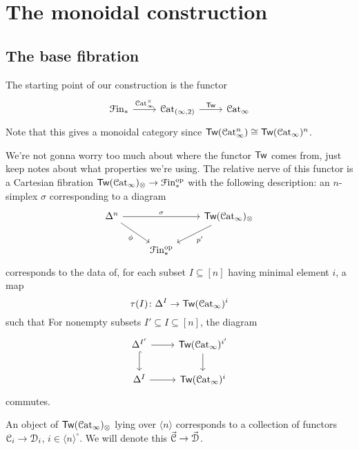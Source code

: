 \documentclass[main.tex]{subfiles}
\begin{document}
\section{The monoidal construction}
\label{sec:the_monoidal_construction}

\subsection{The base fibration}
\label{ssc:base_fibrations}

The starting point of our construction is the functor
\begin{equation*}
  \begin{tikzcd}
    \Finp
    \arrow[r, "\ICat^{\times}"]
    & \Cat_{(\infty, 2)}
    \arrow[r, "\Tw"]
    & \ICat
  \end{tikzcd}
\end{equation*}
Note that this gives a monoidal category since $\mathsf{Tw}(\mathcal{C}\mathrm{at}_{\infty}^{n})\cong \mathsf{Tw}(\mathcal{C}\mathrm{at}_{\infty})^{n}$.

We're not gonna worry too much about where the functor $\mathsf{Tw}$ comes from, just keep notes about what properties we're using. The relative nerve of this functor is a Cartesian fibration $\mathsf{Tw}(\mathcal{C}\mathrm{at}_{\infty})_{\otimes} \to \mathcal{F}\mathrm{in}_{*}^{\mathrm{op}}$ with the following description: an $n$-simplex $\sigma$ corresponding to a diagram
\begin{equation*}
  \begin{tikzcd}
    \Delta^{n}
    \arrow[rr, "\sigma"]
    \arrow[dr, swap, "\phi"]
    && \Tw(\ICat)_{\otimes}
    \arrow[dl, "p'"]
    \\
    & \Finp\op
  \end{tikzcd}
\end{equation*}
corresponds to the data of, for each subset $I \subseteq [n]$ having minimal element $i$, a map
\begin{equation*}
  \tau(I)\colon \Delta^{I} \to \mathsf{Tw}(\mathcal{C}\mathrm{at}_{\infty})^{i}
\end{equation*}
such that For nonempty subsets $I' \subseteq I \subseteq [n]$, the diagram
\begin{equation*}
  \begin{tikzcd}
    \Delta^{I'}
    \arrow[r]
    \arrow[d, hook]
    & \Tw(\ICat)^{i'}
    \arrow[d]
    \\
    \Delta^{I}
    \arrow[r]
    & \Tw(\ICat)^{i}
  \end{tikzcd}
\end{equation*}
commutes.

\begin{example}
  An object of $\mathsf{Tw}(\mathcal{C}\mathrm{at}_{\infty})_{\otimes}$ lying over $\langle n \rangle$ corresponds to a collection of functors $\mathcal{C}_{i} \to \mathcal{D}_{i}$, $i \in \langle n \rangle^{\circ}$. We will denote this $\vec{\mathcal{C}} \to \vec{\mathcal{D}}$.
\end{example}
\end{document}
